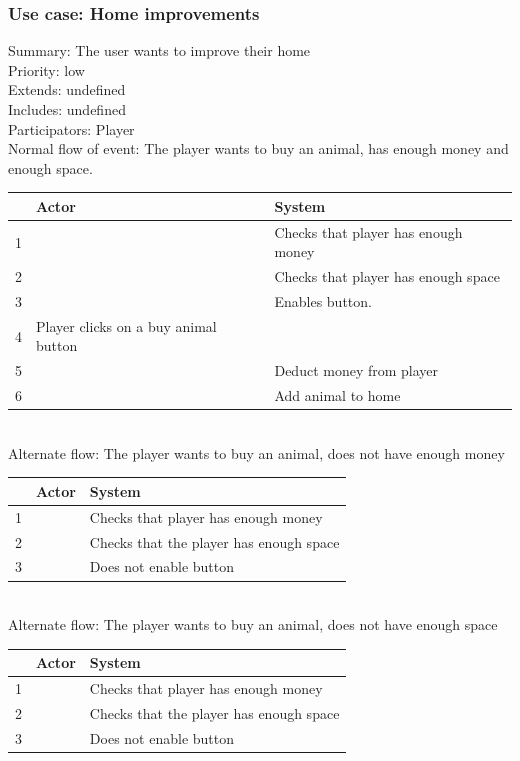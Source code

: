 \documentclass{article}
\begin{document}
\subsubsection{Use case: Home improvements}
Summary: The user wants to improve their home\\
Priority: low \\
Extends: undefined\\
Includes: undefined\\
Participators: Player\\
Normal flow of event: The player wants to buy an animal, has enough money and enough space.\\
\begin{tabular}{|c|l|l|} \hline
      & Actor & System \\ \hline
    1 & & Checks that player has enough money \\ \hline
    2 & & Checks that player has enough space \\ \hline
    3 & & Enables button. \\ \hline
    4 & Player clicks on a buy animal button & \\ \hline
    5 & & Deduct money from player \\ \hline
    6 & & Add animal to home \\ \hline
\end{tabular}  \\
Alternate flow: The player wants to buy an animal, does not have enough money 
\begin{tabular}{|c|l|l|} \hline
      & Actor & System \\ \hline
    1 & & Checks that player has enough money \\ \hline
    2 & & Checks that the player has enough space \\ \hline
    3 & & Does not enable button \\ \hline
\end{tabular}  \\
Alternate flow: The player wants to buy an animal, does not have enough space 
\begin{tabular}{|c|l|l|} \hline
      & Actor & System \\ \hline
    1 & & Checks that player has enough money \\ \hline
    2 & & Checks that the player has enough space \\ \hline
    3 & & Does not enable button \\ \hline
\end{tabular}  \\
\end{document}
